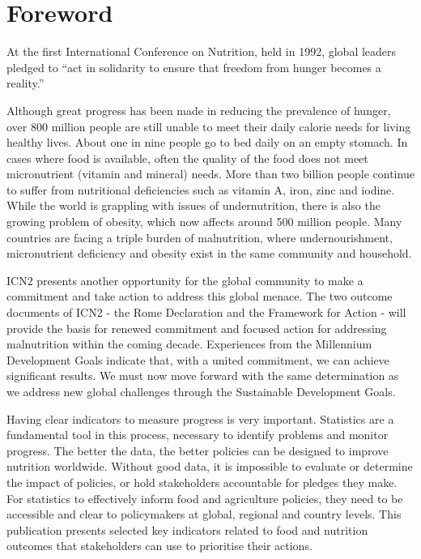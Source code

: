 \section{Foreword}

\bigskip
\bigskip

\large

At the first International Conference on Nutrition, held in 1992, global leaders pledged to “act in solidarity to ensure that freedom from hunger becomes a reality.”

Although great progress has been made in reducing the prevalence of hunger, over 800 million people are still unable to meet their daily calorie needs for living healthy lives. About one in nine people go to bed daily on an empty stomach. In cases where food is available, often the quality of the food does not meet micronutrient (vitamin and mineral) needs. More than two billion people continue to suffer from nutritional deficiencies such as vitamin A, iron, zinc and iodine. While the world is grappling with issues of undernutrition, there is also the growing problem of obesity, which now affects around 500 million people. Many countries are facing a triple burden of malnutrition, where undernourishment, micronutrient deficiency and obesity exist in the same community and household. 

ICN2 presents another opportunity for the global community to make a commitment and take action to address this global menace. The two outcome documents of ICN2 - the Rome Declaration and the Framework for Action - will provide the basis for renewed commitment and focused action for addressing malnutrition within the coming decade. Experiences from the Millennium Development Goals indicate that, with a united commitment, we can achieve significant results. We must now move forward with the same determination as we address new global challenges through the Sustainable Development Goals.

Having clear indicators to measure progress is very important. Statistics are a fundamental tool in this process, necessary to identify problems and monitor progress. The better the data, the better policies can be designed to improve nutrition worldwide. Without good data, it is impossible to evaluate or determine the impact of policies, or hold stakeholders accountable for pledges they make. For statistics to effectively inform food and agriculture policies, they need to be accessible and clear to policymakers at global, regional and country levels. This publication presents selected key indicators related to food and nutrition outcomes that stakeholders can use to prioritise their actions.  

